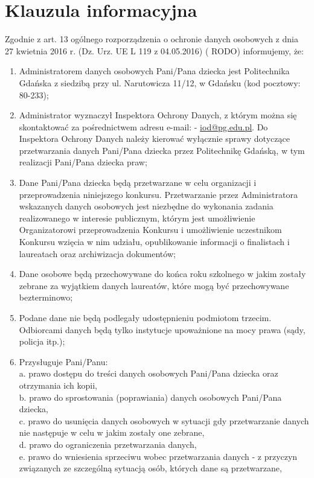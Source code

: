 \documentclass[10pt]{article}
\begin{document}
\section*{Klauzula informacyjna}
Zgodnie z art. 13 ogólnego rozporządzenia o ochronie danych osobowych z dnia 27 kwietnia 2016 r. (Dz. Urz. UE L 119 z 04.05.2016) ( RODO) informujemy, że:

\begin{enumerate}
  \item Administratorem danych osobowych Pani/Pana dziecka jest Politechnika Gdańska z siedzibą przy ul. Narutowicza 11/12, w Gdańsku (kod pocztowy: 80-233);
  \item Administrator wyznaczył Inspektora Ochrony Danych, z którym można się skontaktować za pośrednictwem adresu e-mail: - \href{mailto:iod@pg.edu.pl}{iod@pg.edu.pl}. Do Inspektora Ochrony Danych należy kierować wyłącznie sprawy dotyczące przetwarzania danych Pani/Pana dziecka przez Politechnikę Gdańską, w tym realizacji Pani/Pana dziecka praw;
  \item Dane Pani/Pana dziecka będą przetwarzane w celu organizacji i przeprowadzenia niniejszego konkursu. Przetwarzanie przez Administratora wskazanych danych osobowych jest niezbędne do wykonania zadania realizowanego w interesie publicznym, którym jest umożliwienie Organizatorowi przeprowadzenia Konkursu i umożliwienie uczestnikom Konkursu wzięcia w nim udziału, opublikowanie informacji o finalistach i laureatach oraz archiwizacja dokumentów;
  \item Dane osobowe będą przechowywane do końca roku szkolnego w jakim zostały zebrane za wyjątkiem danych laureatów, które mogą być przechowywane bezterminowo;
  \item Podane dane nie będą podlegały udostępnieniu podmiotom trzecim. Odbiorcami danych będą tylko instytucje upoważnione na mocy prawa (sądy, policja itp.);
  \item Przysługuje Pani/Panu:\\
a. prawo dostępu do treści danych osobowych Pani/Pana dziecka oraz otrzymania ich kopii,\\
b. prawo do sprostowania (poprawiania) danych osobowych Pani/Pana dziecka,\\
c. prawo do usunięcia danych osobowych w sytuacji gdy przetwarzanie danych nie następuje w celu w jakim zostały one zebrane,\\
d. prawo do ograniczenia przetwarzania danych,\\
e. prawo do wniesienia sprzeciwu wobec przetwarzania danych - z przyczyn związanych ze szczególną sytuacją osób, których dane są przetwarzane,\\

\end{enumerate}
\end{document}
